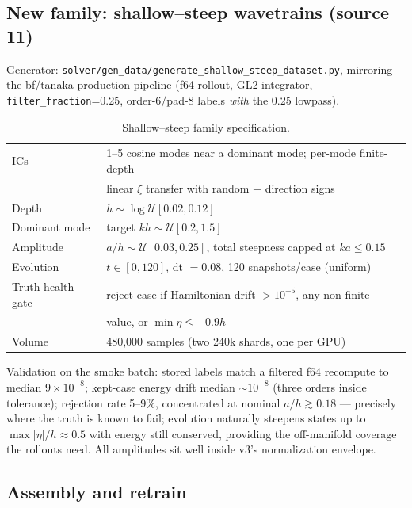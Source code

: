\documentclass[11pt,letterpaper]{article}
\begin{document}
\subsection{New family: shallow--steep wavetrains (source 11)}

Generator: \texttt{solver/gen\_data/generate\_shallow\_steep\_dataset.py},
mirroring the bf/tanaka production pipeline (f64 rollout, GL2 integrator,
\texttt{filter\_fraction}=0.25, order-6/pad-8 labels \emph{with} the 0.25
lowpass).

\begin{table}[h]
\centering
\small
\begin{tabular}{ll}
\toprule
ICs & 1--5 cosine modes near a dominant mode; per-mode finite-depth\\
    & linear $\xi$ transfer with random $\pm$ direction signs \\
Depth & $h \sim \log\mathcal{U}[0.02, 0.12]$ \\
Dominant mode & target $kh \sim \mathcal{U}[0.2, 1.5]$ \\
Amplitude & $a/h \sim \mathcal{U}[0.03, 0.25]$, total steepness capped at $ka \le 0.15$ \\
Evolution & $t \in [0, 120]$, dt $=0.08$, 120 snapshots/case (uniform) \\
Truth-health gate & reject case if Hamiltonian drift $> 10^{-5}$, any non-finite\\
                  & value, or $\min\eta \le -0.9h$ \\
Volume & 480{,}000 samples (two 240k shards, one per GPU) \\
\bottomrule
\end{tabular}
\caption{Shallow--steep family specification.}
\end{table}

Validation on the smoke batch: stored labels match a filtered f64 recompute to
median $9\times10^{-8}$; kept-case energy drift median $\sim10^{-8}$ (three
orders inside tolerance); rejection rate 5--9\%, concentrated at nominal
$a/h \gtrsim 0.18$ --- precisely where the truth is known to fail; evolution
naturally steepens states up to $\max|\eta|/h \approx 0.5$ with energy still
conserved, providing the off-manifold coverage the rollouts need. All
amplitudes sit well inside v3's normalization envelope.

\subsection{Assembly and retrain}
\end{document}
